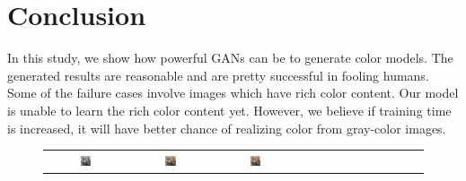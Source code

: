\documentclass[10pt,twocolumn,letterpaper]{article}
\def\acollumsize{0.14\textwidth}
\begin{document}
\section{Conclusion}
In this study, we show how powerful GANs can be to generate color models. The generated results are reasonable and are pretty successful in fooling humans. Some of the failure cases involve images which have rich color content. Our model is unable to learn the rich color content yet. However, we believe if training time is increased, it will have better chance of realizing color from gray-color images.
{\small


}

\newpage
\newpage

\begin{figure}[t!]
\begin{center}
\small
\setlength{\tabcolsep}{2pt}
\begin{tabular}{ ccccccccccccc }
\includegraphics[width=\acollumsize]{img/result/1_in.JPEG}&
\includegraphics[width=\acollumsize]{img/result/1.png}&
\includegraphics[width=\acollumsize]{img/result/1_gt.JPEG}& &&


\end{tabular}
\end{center}
\end{figure}
\end{document}
